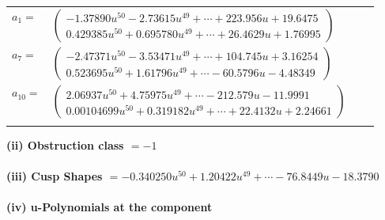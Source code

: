 \documentclass[1p]{elsarticle_modified}
\theoremstyle{definition}
\begin{document}
\begin{tabular}{m{7pt} m{180pt} m{7pt} m{180pt} }
\flushright $a_{1}=$&$\begin{pmatrix}-1.37890 u^{50}-2.73615 u^{49}+\cdots+223.956 u+19.6475\\0.429385 u^{50}+0.695780 u^{49}+\cdots+26.4629 u+1.76995\end{pmatrix}$ \\
\flushright $a_{7}=$&$\begin{pmatrix}-2.47371 u^{50}-3.53471 u^{49}+\cdots+104.745 u+3.16254\\0.523695 u^{50}+1.61796 u^{49}+\cdots-60.5796 u-4.48349\end{pmatrix}$ \\
\flushright $a_{10}=$&$\begin{pmatrix}2.06937 u^{50}+4.75975 u^{49}+\cdots-212.579 u-11.9991\\0.00104699 u^{50}+0.319182 u^{49}+\cdots+22.4132 u+2.24661\end{pmatrix}$\\&\end{tabular}
\flushleft \textbf{(ii) Obstruction class $= -1$}\\~\\
\flushleft \textbf{(iii) Cusp Shapes $= -0.340250 u^{50}+1.20422 u^{49}+\cdots-76.8449 u-18.3790$}\\~\\
\newpage\renewcommand{\arraystretch}{1}
\flushleft \textbf{(iv) u-Polynomials at the component}\newline \\
\end{document}
